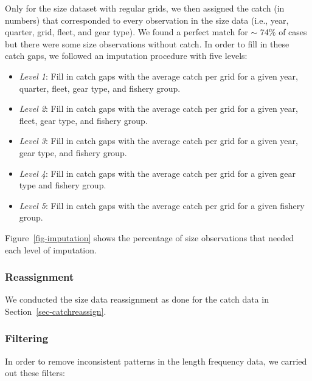 \documentclass[
]{scrartcl}
\providecommand{\tightlist}{%
  \setlength{\itemsep}{0pt}\setlength{\parskip}{0pt}}\usepackage{longtable,booktabs,array}
\begin{document}
Only for the size dataset with regular grids, we then assigned the catch
(in numbers) that corresponded to every observation in the size data
(i.e., year, quarter, grid, fleet, and gear type). We found a perfect
match for \(\sim\) 74\% of cases but there were some size observations
without catch. In order to fill in these catch gaps, we followed an
imputation procedure with five levels:

\begin{itemize}
\tightlist
\item
  \emph{Level 1}: Fill in catch gaps with the average catch per grid for
  a given year, quarter, fleet, gear type, and fishery group.
\item
  \emph{Level 2}: Fill in catch gaps with the average catch per grid for
  a given year, fleet, gear type, and fishery group.
\item
  \emph{Level 3}: Fill in catch gaps with the average catch per grid for
  a given year, gear type, and fishery group.
\item
  \emph{Level 4}: Fill in catch gaps with the average catch per grid for
  a given gear type and fishery group.
\item
  \emph{Level 5}: Fill in catch gaps with the average catch per grid for
  a given fishery group.
\end{itemize}

Figure~\ref{fig-imputation} shows the percentage of size observations
that needed each level of imputation.

\subsubsection{Reassignment}\label{reassignment}

We conducted the size data reassignment as done for the catch data in
Section~\ref{sec-catchreassign}.

\subsubsection{Filtering}\label{filtering}

In order to remove inconsistent patterns in the length frequency data,
we carried out these filters:
\end{document}
